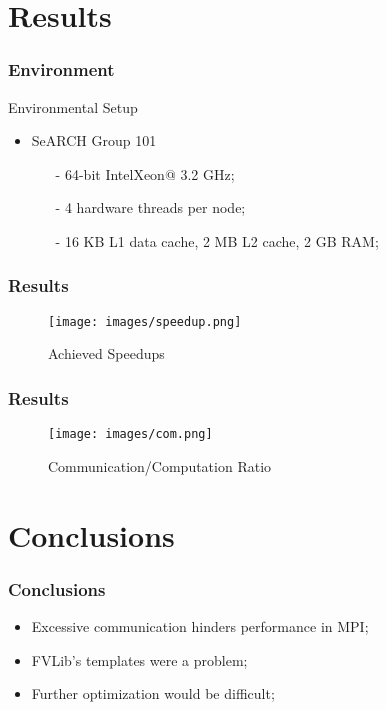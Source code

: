 \documentclass{beamer}
\begin{document}
\section{Results}

\begin{frame}
	\frametitle{Environment}
	\begin{block}{Environmental Setup}
		\begin{itemize}
			\item{SeARCH Group 101
			\begin{itemize}
				\item[-]{64-bit Intel\textregistered Xeon\texttrademark @ 3.2 GHz;}
				\item[-]{4 hardware threads per node;}
				\item[-]{16 KB L1 data cache, 2 MB L2 cache, 2 GB RAM;}
			\end{itemize}
			}			
		\end{itemize}
	\end{block}	
\end{frame}

\begin{frame}
	\frametitle{Results}
	\begin{figure}[!htp]
    \centering   
        \texttt{[image: images/speedup.png]}
        \caption{Achieved Speedups}    
\end{figure}
\end{frame}

\begin{frame}
	\frametitle{Results}
	\begin{figure}[!htp]
    \centering   
        \texttt{[image: images/com.png]}
        \caption{Communication/Computation Ratio}    
\end{figure}
\end{frame}


\section{Conclusions}

\begin{frame}
	\frametitle{Conclusions}
	\begin{itemize}
		\item Excessive communication hinders performance in MPI;
		\item FVLib's templates were a problem;
		\item Further optimization would be difficult;
	\end{itemize}	
\end{frame}
\end{document}
